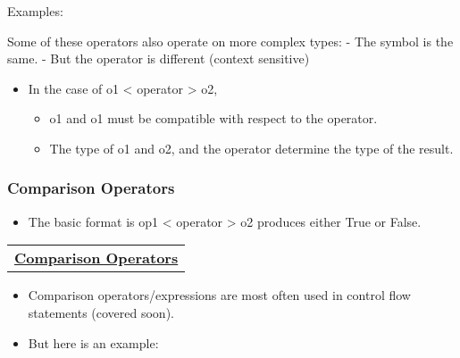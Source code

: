 \documentclass[11pt]{article}
\providecommand{\tightlist}{%
      \setlength{\itemsep}{0pt}\setlength{\parskip}{0pt}}
\begin{document}
    Examples: 

    Some of these operators also operate on more complex types: - The symbol
is the same. - But the operator is different (context sensitive)

    \begin{itemize}
\tightlist
\item
  In the case of o1 \textless{} operator \textgreater{} o2,

  \begin{itemize}
  \tightlist
  \item
    o1 and o1 must be compatible with respect to the operator.
  \item
    The type of o1 and o2, and the operator determine the type of the
    result.
  \end{itemize}
\end{itemize}

    \subsubsection{Comparison Operators}\label{comparison-operators}

\begin{itemize}
\tightlist
\item
  The basic format is op1 \textless{} operator \textgreater{} o2
  produces either True or False.
\end{itemize}

\begin{longtable}[]{@{}c@{}}
\toprule
\tabularnewline
\midrule
\endhead
\href{https://www.tutorialspoint.com/python/python_basic_operators.htm}{\textbf{Comparison
Operators}}\tabularnewline
\bottomrule
\end{longtable}

    \begin{itemize}
\item
  Comparison operators/expressions are most often used in control flow
  statements (covered soon).
\item
  But here is an example:
\end{itemize}
\end{document}
